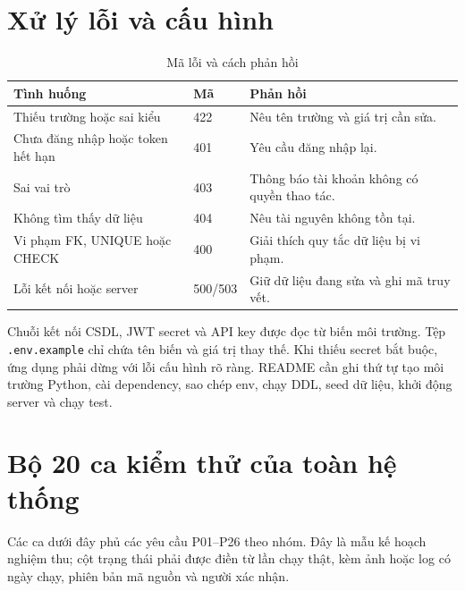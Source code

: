 \section{Xử lý lỗi và cấu hình}

\begin{table}[h!]
\centering
\small
\caption{Mã lỗi và cách phản hồi}
\begin{tabularx}{\textwidth}{|L{3.2cm}|C{1.5cm}|Y|}
\hline
\textbf{Tình huống} & \textbf{Mã} & \textbf{Phản hồi}\\\hline
Thiếu trường hoặc sai kiểu & 422 & Nêu tên trường và giá trị cần sửa.\\\hline
Chưa đăng nhập hoặc token hết hạn & 401 & Yêu cầu đăng nhập lại.\\\hline
Sai vai trò & 403 & Thông báo tài khoản không có quyền thao tác.\\\hline
Không tìm thấy dữ liệu & 404 & Nêu tài nguyên không tồn tại.\\\hline
Vi phạm FK, UNIQUE hoặc CHECK & 400 & Giải thích quy tắc dữ liệu bị vi phạm.\\\hline
Lỗi kết nối hoặc server & 500/503 & Giữ dữ liệu đang sửa và ghi mã truy vết.\\\hline
\end{tabularx}
\end{table}

Chuỗi kết nối CSDL, JWT secret và API key được đọc từ biến môi trường. Tệp \texttt{.env.example} chỉ chứa tên biến và giá trị thay thế. Khi thiếu secret bắt buộc, ứng dụng phải dừng với lỗi cấu hình rõ ràng. README cần ghi thứ tự tạo môi trường Python, cài dependency, sao chép env, chạy DDL, seed dữ liệu, khởi động server và chạy test.

\section{Bộ 20 ca kiểm thử của toàn hệ thống}

Các ca dưới đây phủ các yêu cầu P01--P26 theo nhóm. Đây là mẫu kế hoạch nghiệm thu; cột trạng thái phải được điền từ lần chạy thật, kèm ảnh hoặc log có ngày chạy, phiên bản mã nguồn và người xác nhận.

